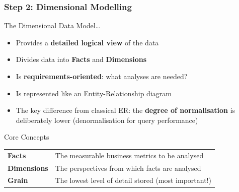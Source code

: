 \begin{frame}
  \frametitle{Step 2: Dimensional Modelling}

  \begin{block}{The Dimensional Data Model\ldots}
    \begin{itemize}
      \item Provides a \textbf{detailed logical view} of the data
      \item Divides data into \textbf{Facts} and \textbf{Dimensions}
      \item Is \textbf{requirements-oriented}: what analyses are needed?
      \item Is represented like an Entity-Relationship diagram
      \item The key difference from classical ER: the \textbf{degree of normalisation}
        is deliberately lower (denormalisation for query performance)
    \end{itemize}
  \end{block}

  \begin{block}{Core Concepts}
    \begin{tabularx}{\linewidth}{@{}l X@{}}
      \textbf{Facts}      & The measurable business metrics to be analysed \\
      \textbf{Dimensions} & The perspectives from which facts are analysed \\
      \textbf{Grain}      & The lowest level of detail stored (most important!) \\
    \end{tabularx}
  \end{block}
\end{frame}

